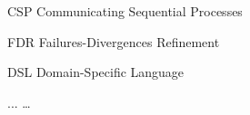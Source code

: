 \begin{siglas}
  \item[CSP] Communicating Sequential Processes	
  \item[FDR] Failures-Divergences Refinement
  \item[DSL] Domain-Specific Language
  \item[...] \ldots
\end{siglas}